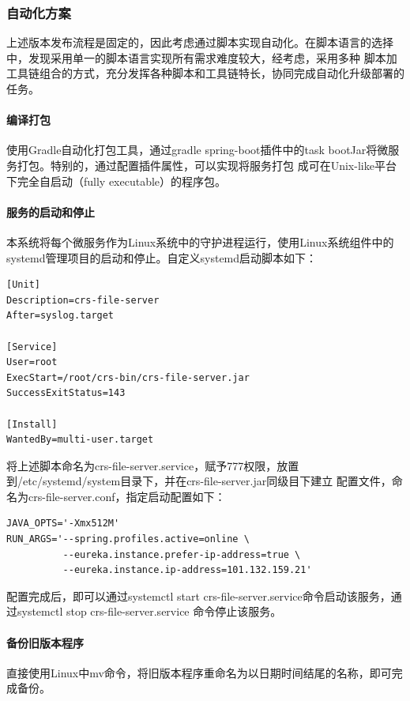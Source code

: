 \documentclass[titlepage,UTF8,linespread=1.5]{ctexart}
\begin{document}
\subsubsection{自动化方案}
上述版本发布流程是固定的，因此考虑通过脚本实现自动化。在脚本语言的选择中，发现采用单一的脚本语言实现所有需求难度较大，经考虑，采用多种
脚本加工具链组合的方式，充分发挥各种脚本和工具链特长，协同完成自动化升级部署的任务。\par
\paragraph{编译打包}
使用Gradle自动化打包工具，通过gradle spring-boot插件中的task bootJar将微服务打包。特别的，通过配置插件属性，可以实现将服务打包
成可在Unix-like平台下完全自启动（fully executable）\cite{fully-executable}的程序包。\par
\paragraph{服务的启动和停止}
本系统将每个微服务作为Linux系统中的守护进程运行，使用Linux系统组件中的systemd管理项目的启动和停止。自定义systemd启动脚本如下：
\begin{mdframed}\begin{verbatim}
[Unit]
Description=crs-file-server
After=syslog.target

[Service]
User=root
ExecStart=/root/crs-bin/crs-file-server.jar
SuccessExitStatus=143

[Install]
WantedBy=multi-user.target
\end{verbatim}\end{mdframed}\par
将上述脚本命名为crs-file-server.service，赋予777权限，放置到/etc/systemd/system目录下，并在crs-file-server.jar同级目下建立
配置文件，命名为crs-file-server.conf，指定启动配置如下：
\begin{mdframed}\begin{verbatim}
JAVA_OPTS='-Xmx512M'
RUN_ARGS='--spring.profiles.active=online \
          --eureka.instance.prefer-ip-address=true \
          --eureka.instance.ip-address=101.132.159.21'
\end{verbatim}\end{mdframed}\par
配置完成后，即可以通过systemctl start crs-file-server.service命令启动该服务，通过systemctl stop crs-file-server.service
命令停止该服务。\par
\paragraph{备份旧版本程序}
直接使用Linux中mv命令，将旧版本程序重命名为以日期时间结尾的名称，即可完成备份。
\end{document}

